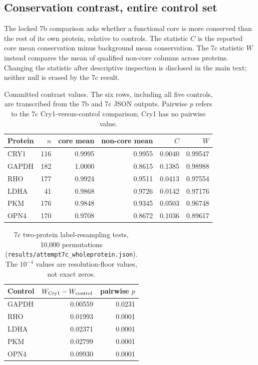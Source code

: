 \subsection{Conservation contrast, entire control set}
The locked 7b comparison asks whether a functional core is more conserved than the rest of its own protein, relative to controls. The statistic $C$ is the reported core mean conservation minus background mean conservation. The 7c statistic $W$ instead compares the mean of qualified non-core columns across proteins. Changing the statistic after descriptive inspection is disclosed in the main text; neither null is erased by the 7c result.
\begin{table}[ht]\centering\small\caption{Committed contrast values. The six rows, including all five controls, are transcribed from the 7b and 7c JSON outputs. Pairwise $p$ refers to the 7c Cry1-versus-control comparison; Cry1 has no pairwise value.}\begin{tabular}{lrrrrr}\hline
Protein & $n$ & core mean & non-core mean & $C$ & $W$ \\\hline
CRY1 & 116 & 0.9995 & 0.9955 & 0.0040 & 0.99547 \\
GAPDH & 182 & 1.0000 & 0.8615 & 0.1385 & 0.98988 \\
RHO & 177 & 0.9924 & 0.9511 & 0.0413 & 0.97554 \\
LDHA & 41 & 0.9868 & 0.9726 & 0.0142 & 0.97176 \\
PKM & 176 & 0.9848 & 0.9345 & 0.0503 & 0.96748 \\
OPN4 & 170 & 0.9708 & 0.8672 & 0.1036 & 0.89617 \\
\hline\end{tabular}\end{table}
\begin{table}[ht]\centering\small\caption{7c two-protein label-resampling tests, 10,000 permutations (\texttt{results/attempt7c\_wholeprotein.json}). The $10^{-4}$ values are resolution-floor values, not exact zeros.}\begin{tabular}{lrr}\hline
Control & $W_{\rm Cry1}-W_{\rm control}$ & pairwise $p$ \\\hline
GAPDH & 0.00559 & 0.0231 \\
RHO & 0.01993 & 0.0001 \\
LDHA & 0.02371 & 0.0001 \\
PKM & 0.02799 & 0.0001 \\
OPN4 & 0.09930 & 0.0001 \\
\hline\end{tabular}\end{table}
